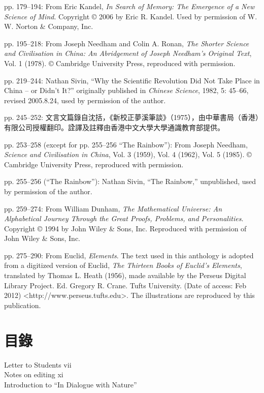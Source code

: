 \noindent pp. 179--194: From Eric Kandel, \textit{In Search of Memory: The Emergence of a New Science of Mind}. Copyright © 2006 by Eric R. Kandel. Used by permission of W. W. Norton \& Company, Inc.

\noindent pp. 195--218: From Joseph Needham and Colin A. Ronan, \textit{The Shorter Science and Civilisation in China: An Abridgement of Joseph Needham's Original Text}, Vol. 1 (1978). © Cambridge University Press, reproduced with permission.

\noindent pp. 219--244: Nathan Sivin, ``Why the Scientific Revolution Did Not Take Place in China -- or Didn't It?'' originally published in \textit{Chinese Science}, 1982, 5: 45--66, revised 2005.8.24, used by permission of the author.

\noindent pp. 245--252: 文言文篇錄自沈括，《新校正夢溪筆談》（1975），由中華書局（香港）有限公司授權翻印。詮譯及註釋由香港中文大學大學通識教育部提供。

\noindent pp. 253--258 (except for pp. 255--256 ``The Rainbow''): From Joseph Needham, \textit{Science and Civilisation in China}, Vol. 3 (1959), Vol. 4 (1962), Vol. 5 (1985). © Cambridge University Press, reproduced with permission.

\noindent pp. 255--256 (``The Rainbow''): Nathan Sivin, ``The Rainbow,'' unpublished, used by permission of the author.

\noindent pp. 259--274: From William Dunham, \textit{The Mathematical Universe: An Alphabetical Journey Through the Great Proofs, Problems, and Personalities}. Copyright © 1994 by John Wiley \& Sons, Inc. Reproduced with permission of John Wiley \& Sons, Inc.

\noindent pp. 275--290: From Euclid, \textit{Elements}. The text used in this anthology is adopted from a digitized version of Euclid, \textit{The Thirteen Books of Euclid's Elements}, translated by Thomas L. Heath (1956), made available by the Perseus Digital Library Project. Ed. Gregory R. Crane. Tufts University. (Date of access: Feb 2012) <http://www.perseus.tufts.edu>. The illustrations are reproduced by this publication.

\section*{目錄}
\noindent Letter to Students \dotfill vii\\
Notes on editing \dotfill xi\\
Introduction to ``In Dialogue with Nature'' 

